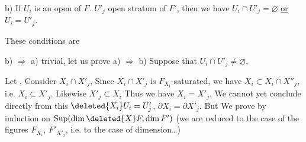 



b) If $U_i$ is an open  of $F$. $U'_j$ open stratum of $F'$, then we have $U_i\cap U'_j=\varnothing$ \uline{or} $U_i=U'_j$.

These conditions are 



b) $\Rightarrow$ a) trivial, let us prove a) $\Rightarrow$ b)  Suppose that $U_i\cap U'_j\ne\varnothing$,  


 Let  , Consider $X_i\cap X'_j$,  Since $X_i\cap X'_j$ is  $F_{X_i}$-saturated,    we have $X_i\subset X_i\cap X''_j$,
 i.e. $X_i\subset X'_j$. Likewise $X'_j\subset X_i$ Thus we have $X_i=X'_j$. We cannot yet conclude directly from this $\deleted{X_i}U_i=U'_j$,   $\partial X_i=\partial X'_j$. But
We prove   by induction on  $\operatorname{Sup}(\dim\deleted{X}F,\dim F')$ (we are reduced to the case of the figures $F_{X_i}$, $F'_{X'_j}$, i.e. to the case of  dimension\ldots)
